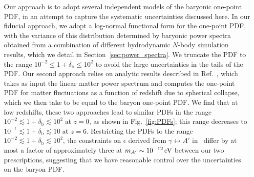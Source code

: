 \documentclass[prd,aps,10pt,nofootinbib,twocolumn,superscriptaddress,preprintnumbers,balancelastpage,longbibliography]{revtex4-1}
\begin{document}
Our approach is to adopt several independent models of the baryonic one-point PDF, in an attempt to capture the systematic uncertainties discussed here.
In our fiducial approach, we adopt a log-normal functional form for the one-point PDF, with the variance of this distribution determined by baryonic power spectra obtained from a combination of different hydrodynamic $N$-body simulation results, which we detail in Section~\ref{sec:power_spectra}. 
We truncate the PDF to the range $10^{-2} \leq 1 + \delta_\text{b} \leq 10^2$ to avoid the large uncertainties in the tails of the PDF. 
Our second approach relies on analytic results described in Ref.~\cite{Ivanov:2018lcg}, which takes as input the linear matter power spectrum and computes the one-point PDF for matter fluctuations as a function of redshift due to spherical collapse, which we then take to be equal to the baryon one-point PDF\@.
We find that at low redshifts, these two approaches lead to similar PDFs in the range $10^{-2} \lesssim 1 + \delta_\text{b} \lesssim 10^2$ at $z = 0$, as shown in Fig.~\ref{fig:PDFs}; this range decreases to $10^{-1} \lesssim 1 + \delta_\text{b} \lesssim 10$ at $z = 6$. 
Restricting the PDFs to the range $10^{-2} \lesssim 1 + \delta_\text{b} \lesssim 10^2$, the constraints on $\epsilon$ derived from $\gamma \leftrightarrow A'$ in~ differ by at most a factor of approximately three at $\mAp \sim \SI{e-12}{\eV}$ between our two prescriptions, suggesting that we have reasonable control over the uncertainties on the baryon PDF. 
\end{document}
